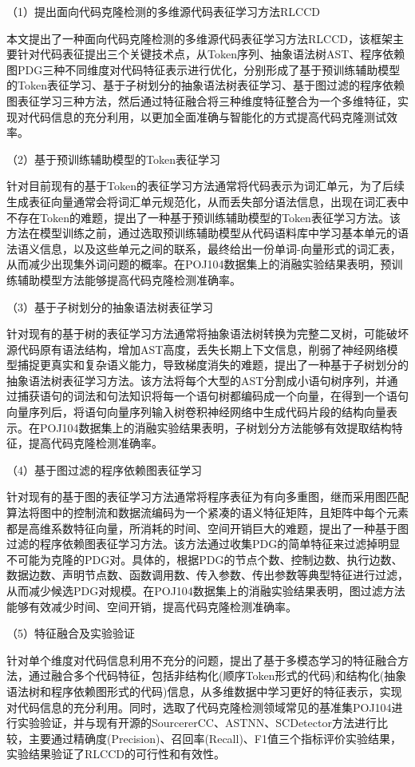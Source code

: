 （1）提出面向代码克隆检测的多维源代码表征学习方法RLCCD 

本文提出了一种面向代码克隆检测的多维源代码表征学习方法RLCCD，该框架主要针对代码表征提出三个关键技术点，从Token序列、抽象语法树AST、程序依赖图PDG三种不同维度对代码特征表示进行优化，分别形成了基于预训练辅助模型的Token表征学习、基于子树划分的抽象语法树表征学习、基于图过滤的程序依赖图表征学习三种方法，然后通过特征融合将三种维度特征整合为一个多维特征，实现对代码信息的充分利用，以更加全面准确与智能化的方式提高代码克隆测试效率。 

（2）基于预训练辅助模型的Token表征学习

针对目前现有的基于Token的表征学习方法通常将代码表示为词汇单元，为了后续生成表征向量通常会将词汇单元规范化，从而丢失部分语法信息，出现在词汇表中不存在Token的难题，提出了一种基于预训练辅助模型的Token表征学习方法。该方法在模型训练之前，通过选取预训练辅助模型从代码语料库中学习基本单元的语法语义信息，以及这些单元之间的联系，最终给出一份单词-向量形式的词汇表，从而减少出现集外词问题的概率。在POJ104数据集上的消融实验结果表明，预训练辅助模型方法能够提高代码克隆检测准确率。

（3）基于子树划分的抽象语法树表征学习

针对现有的基于树的表征学习方法通常将抽象语法树转换为完整二叉树，可能破坏源代码原有语法结构，增加AST高度，丢失长期上下文信息，削弱了神经网络模型捕捉更真实和复杂语义能力，导致梯度消失的难题，提出了一种基于子树划分的抽象语法树表征学习方法。该方法将每个大型的AST分割成小语句树序列，并通过捕获语句的词法和句法知识将每一个语句树都编码成一个向量，在得到一个语句向量序列后，将语句向量序列输入树卷积神经网络中生成代码片段的结构向量表示。在POJ104数据集上的消融实验结果表明，子树划分方法能够有效提取结构特征，提高代码克隆检测准确率。

（4）基于图过滤的程序依赖图表征学习

针对现有的基于图的表征学习方法通常将程序表征为有向多重图，继而采用图匹配算法将图中的控制流和数据流编码为一个紧凑的语义特征矩阵，且矩阵中每个元素都是高维系数特征向量，所消耗的时间、空间开销巨大的难题，提出了一种基于图过滤的程序依赖图表征学习方法。该方法通过收集PDG的简单特征来过滤掉明显不可能为克隆的PDG对。具体的，根据PDG的节点个数、控制边数、执行边数、数据边数、声明节点数、函数调用数、传入参数、传出参数等典型特征进行过滤，从而减少候选PDG对规模。在POJ104数据集上的消融实验结果表明，图过滤方法能够有效减少时间、空间开销，提高代码克隆检测准确率。

（5）特征融合及实验验证

针对单个维度对代码信息利用不充分的问题，提出了基于多模态学习的特征融合方法，通过融合多个代码特征，包括非结构化(顺序Token形式的代码)和结构化(抽象语法树和程序依赖图形式的代码)信息，从多维数据中学习更好的特征表示，实现对代码信息的充分利用。同时，选取了代码克隆检测领域常见的基准集POJ104进行实验验证，并与现有开源的SourcererCC\cite{7886988}、ASTNN\cite{8812062}、SCDetector\cite{10.1145/3324884.3416562}方法进行比较，主要通过精确度(Precision)、召回率(Recall)、F1值三个指标评价实验结果，实验结果验证了RLCCD的可行性和有效性。

